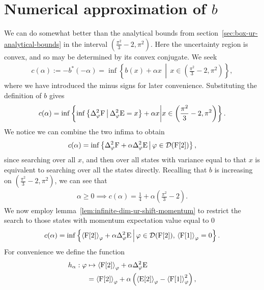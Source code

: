\section{Numerical approximation of $b$}\label{sec:box-ur-numerics}

We can do somewhat better than the analytical bounds from section~\ref{sec:box-ur-analytical-bounds} in the interval $\left(\frac{\pi^2}{3} -2,\pi^2\right)$. Here the uncertainty region is convex, and so may be determined by its convex conjugate. We seek
\begin{align}
  c(\alpha) := -b^*(-\alpha) = \inf \left\{b(x) + \alpha x\,\middle|\,x\in \left(\frac{\pi^2}{3} -2,\pi^2\right)\right\},
\end{align}
where we have introduced the minus signs for later convenience. Substituting the definition of $b$ gives
\begin{align}
  c(\alpha) = \inf \left\{\inf\left\{\var[\varphi]{\opf}\,\middle|\,\var[\varphi]{\ope} = x \right\} + \alpha x\middle| x\in\left(\frac{\pi^2}{3} -2,\pi^2\right)\right\}.
\end{align}
We notice we can combine the two infima to obtain
\begin{align}
  c(\alpha) = \inf\left\{\var[\varphi]{\opf} + \alpha \var[\varphi]{\ope}\,\middle|\,\varphi\in\dom{\opf[2]}\right\},
\end{align}
since searching over all $x$, and then over all states with variance equal to that $x$ is equivalent to searching over all the states directly. Recalling that $b$ is increasing on $\left(\frac{\pi^2}{3} -2,\pi^2\right)$, we can see that
\begin{align}
  \alpha \geq 0 \implies c(\alpha) = \frac{1}{4} + \alpha \left(\frac{\pi^2}{3} -2\right).
\end{align}
We now employ lemma~\ref{lem:infinite-dim-ur-shift-momentum} to restrict the search to those states with momentum expectation value equal to $0$
\begin{align}
  c(\alpha) = \inf\left\{\expe{\opf[2]}{\varphi} + \alpha \var[\varphi]{\ope}\,\middle|\,\varphi\in\dom{\opf[2]},\,\expe{\opf[1]}{\varphi} = 0\right\}.
\end{align}
For convenience we define the function
\begin{align}
  h_{\alpha} : \varphi &\mapsto \expe{\opf[2]}{\varphi} + \alpha \var[\varphi]{\ope}\\
                    &= \expe{\opf[2]}{\varphi} + \alpha\left(\expe{\ope[2]}{\varphi} - \expe{\opf[1]}{\varphi}^2\right),
\end{align}
